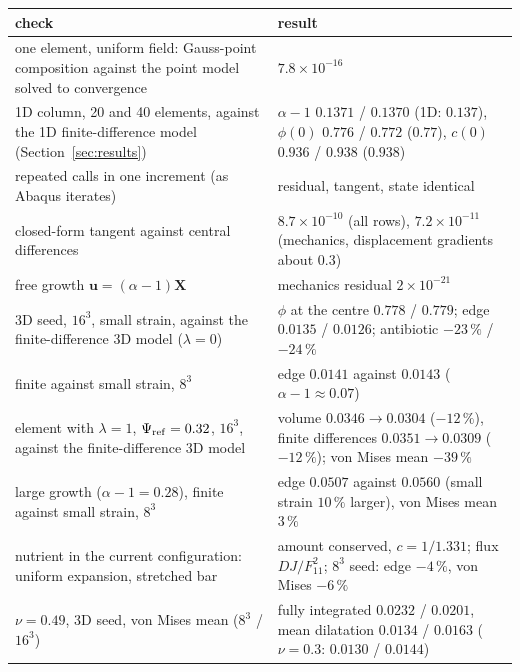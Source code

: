 \documentclass[11pt,a4paper]{article}
\begin{document}
\begin{center}\small
\begin{tabularx}{\linewidth}{@{}Yp{5.2cm}@{}}
\toprule
check & result\\
\midrule
one element, uniform field: Gauss-point composition against the point model solved to convergence & $7.8\times10^{-16}$\\
1D column, 20 and 40 elements, against the 1D finite-difference model (Section~\ref{sec:results}) &
$\alpha-1$ $0.1371$ / $0.1370$ (1D: $0.137$), $\phi(0)$ $0.776$ / $0.772$ ($0.77$), $c(0)$ $0.936$ / $0.938$ ($0.938$)\\
repeated calls in one increment (as Abaqus iterates) & residual, tangent, state identical\\
closed-form tangent against central differences & $8.7\times10^{-10}$ (all rows), $7.2\times10^{-11}$
(mechanics, displacement gradients about $0.3$)\\
free growth $\mathbf u=(\alpha-1)\mathbf X$ & mechanics residual $2\times10^{-21}$\\
3D seed, $16^3$, small strain, against the finite-difference 3D model ($\lambda=0$) & $\phi$ at the
centre $0.778$ / $0.779$; edge $0.0135$ / $0.0126$; antibiotic $-23\,\%$ / $-24\,\%$\\
finite against small strain, $8^3$ & edge $0.0141$ against $0.0143$ ($\alpha-1\approx0.07$)\\
element with $\lambda=1$, $\Psi_{\rm ref}=0.32$, $16^3$, against the finite-difference 3D model & volume $0.0346\to0.0304$ ($-12\,\%$), finite differences $0.0351\to0.0309$ ($-12\,\%$); von Mises mean $-39\,\%$\\
large growth ($\alpha-1=0.28$), finite against small strain, $8^3$ & edge $0.0507$ against $0.0560$ (small strain $10\,\%$ larger), von Mises mean $3\,\%$\\
nutrient in the current configuration: uniform expansion, stretched bar & amount conserved, $c=1/1.331$; flux $DJ/F_{11}^2$; $8^3$ seed: edge $-4\,\%$, von Mises $-6\,\%$\\
$\nu=0.49$, 3D seed, von Mises mean ($8^3$ / $16^3$) & fully integrated $0.0232$ / $0.0201$, mean dilatation $0.0134$ / $0.0163$ ($\nu=0.3$: $0.0130$ / $0.0144$)\\
\bottomrule
\end{tabularx}
\end{center}
\end{document}
